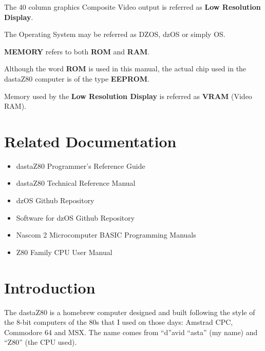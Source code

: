 \documentclass[a4paper,11pt]{article}
\begin{document}
    The 40 column graphics Composite Video output is referred as \textbf{Low
    Resolution Display}.
    
    The Operating System may be referred as DZOS, dzOS or simply OS.

    \textbf{MEMORY} refers to both \textbf{ROM} and \textbf{RAM}.

    Although the word \textbf{ROM} is used in this manual, the actual chip used
    in the dastaZ80 computer is of the type \textbf{EEPROM}.

    Memory used by the \textbf{Low Resolution Display} is referred as
    \textbf{VRAM} (Video RAM).

    \pagebreak
    \section*{Related Documentation}
    \begin{itemize}
        \item dastaZ80 Programmer's Reference Guide\cite{dastaz80progref}
        \item dastaZ80 Technical Reference Manual\cite{dastaz80techman}
        \item dzOS Github Repository\cite{dastaZ80github}
        \item Software for dzOS Github Repository\cite{dastaZ80githubsoft}
        \item Nascom 2 Microcomputer BASIC Programming Manuals\cite{nascombasic}
        \item Z80 Family CPU User Manual\cite{z80manual}
    \end{itemize}

    \pagebreak
    \tableofcontents

    \pagebreak
    \pagestyle{fancy}
    \fancyhf{}
    \fancyfoot[R]{\thepage}
    \setcounter{page}{1}
    \section{Introduction}
    The dastaZ80 is a homebrew computer designed and built following the style
    of the 8-bit computers of the 80s that I used on those days: Amstrad CPC,
    Commodore 64 and MSX. The name comes from “d”avid “asta” (my name) and 
    “Z80” (the CPU used).
\end{document}
